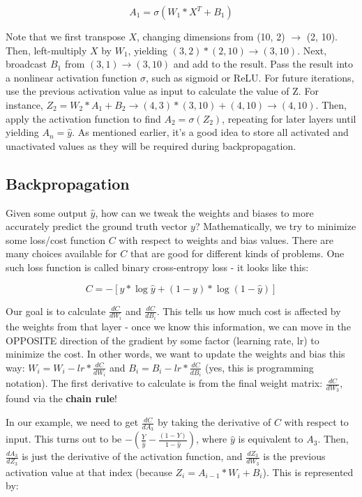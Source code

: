 \documentclass[12pt]{article}
\begin{document}
\[A_1 = \sigma(W_1 * X^T + B_1)\]

Note that we first transpose $X$, changing dimensions from (10, 2) $\rightarrow$ (2, 10). Then, left-multiply $X$ by $W_1$, yielding $(3,2) * (2,10) \rightarrow (3,10)$. Next, broadcast $B_1$ from $(3,1) \rightarrow (3,10)$ and add to the result. Pass the result into a nonlinear activation function $\sigma$, such as sigmoid or ReLU. For future iterations, use the previous activation value as input to calculate the value of Z. For instance, $Z_2 = W_2 * A_1 + B_2 \rightarrow (4, 3) * (3, 10) + (4, 10) \rightarrow (4, 10)$. Then, apply the activation function to find $A_2 = \sigma(Z_2)$, repeating for later layers until yielding $A_n=\hat{y}$. As mentioned earlier, it's a good idea to store all activated and unactivated values as they will be required during backpropagation. 

\subsection{Backpropagation}
Given some output $\hat{y}$, how can we tweak the weights and biases to more accurately predict the ground truth vector $y$? Mathematically, we try to minimize some loss/cost function $C$ with respect to weights and bias values. There are many choices available for $C$ that are good for different kinds of problems. One such loss function is called binary cross-entropy loss - it looks like this:

\[ C = -[y * \log{\hat{y}} + (1-y) * \log{(1-\hat{y})}] \]

Our goal is to calculate $\frac{dC}{dW_i}$ and $\frac{dC}{dB_i}$. This tells us how much cost is affected by the weights from that layer - once we know this information, we can move in the OPPOSITE direction of the gradient by some factor (learning rate, lr) to minimize the cost. In other words, we want to update the weights and bias this way: $W_i = W_i - lr * \frac{dC}{dW_i}$ and $B_i = B_i - lr * \frac{dC}{dB_i}$ (yes, this is programming notation). The first derivative to calculate is from the final weight matrix: $\frac{dC}{dW_3}$, found via the \textbf{chain rule}!

In our example, we need to get $\frac{dC}{dA_3}$ by taking the derivative of $C$ with respect to input. This turns out to be $-(\frac{Y}{\hat{y}} - \frac{(1-Y)}{1-\hat{y}})$, where $\hat{y}$ is equivalent to $A_3$. Then, $\frac{dA_3}{dZ_3}$ is just the derivative of the activation function, and $\frac{dZ_3}{dW_3}$ is the previous activation value at that index (because $Z_i = A_{i-1} * W_i + B_i$). This is represented by:
\end{document}
